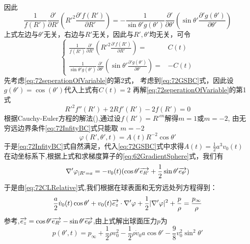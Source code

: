 因此
\begin{equation}
\frac{1}{f(R')}\frac{\partial'}{\partial R'}\left(R'^2 \frac{\partial' f(R')}{\partial R'}\right)
=-\frac{1}{\sin\theta' g(\theta')}\frac{\partial'}{\partial \theta'}\left(\sin\theta' \frac{\partial' g(\theta')}{\partial \theta'}\right)
\end{equation}
上式左边与$\theta'$无关，右边与$R'$无关，因此与$R',\theta'$均无关，可令
\begin{equation}\label{eq:72seperationOfVariable}
\begin{cases}
\frac{1}{f(R')}\frac{\partial'}{\partial R'}\left(R'^2 \frac{\partial' f(R')}{\partial R'}\right) =& C(t)\\
\frac{1}{\sin\theta' g(\theta')}\frac{\partial'}{\partial \theta'}\left(\sin\theta' \frac{\partial' g(\theta')}{\partial \theta'}\right)=& -C(t)
\end{cases}
\end{equation}
先考虑\eqref{eq:72seperationOfVariable}的第2式，
考虑到\eqref{eq:72GSBC}式，因此设$g(\theta')=\cos(\theta')$代入上式有$C(t)=2$
再解\eqref{eq:72seperationOfVariable}的第1式
\begin{equation}
R'^2f''(R')+2Rf'(R')-2f(R')=0
\end{equation}
根据Cauchy-Euler方程的解法(\cite{CEEquation}),通过设$f(R')=R'^m$解得$m=1$或$m=-2$,
由无穷远边界条件\eqref{eq:72InfityBC}式只能取
$m=-2$
\begin{equation}
\varphi(R',\theta',t)=A(t)R^{-2}\cos \theta'
\end{equation}
于是\eqref{eq:72InfityBC}式自然满足，代入\eqref{eq:72GSBC}式中求得$A(t)=\frac{1}{2} a^3 v_0(t)$
在动坐标系下,根据上式和求梯度算子的\eqref{eq:62GradientSphere}式，我们有
\begin{equation}
\nabla' \varphi_{|R'=a}=-v_0(t)(\cos\theta' \overrightarrow{e_{R'}}+\frac{1}{2}\sin\theta' \overrightarrow{e_{\theta'}})
\end{equation}
于是由\eqref{eq:72CLRelative}式,我们根据在球表面和无穷远处列方程得到：
\begin{equation}
\frac{a}{2}\dot{v}_0(t)\cos\theta'+v_0(t)\overrightarrow{e_z}\cdot \nabla'\varphi+\frac{1}{2} |\nabla'\varphi|^2+\frac{p}{\rho}=\frac{p_{\infty}}{\rho}
\end{equation}
参考\cite{Del},$\overrightarrow{e_z}=\cos\theta' \overrightarrow{e_{R'}}-\sin\theta' \overrightarrow{e_{\theta'}}$,由上式解出球面压力$p$为
\begin{equation}
p(\theta',t)=p_{\infty}+\frac{1}{2}\rho v_0^2 - \frac{1}{2} \rho \dot{v}_0 a \cos\theta' -\frac{9}{8}v_0^2 \sin^2\theta'
\end{equation}
